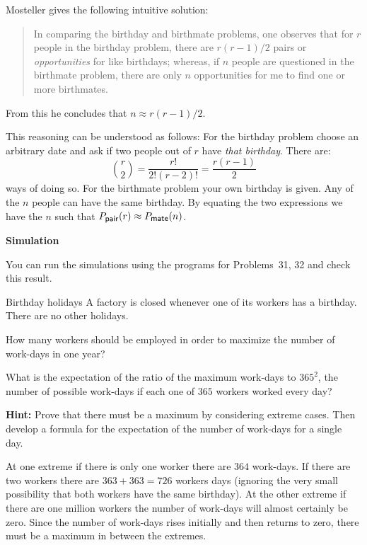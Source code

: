 
Mosteller \cite[p.~322]{birthday} gives the following intuitive solution:
\begin{quote}
In comparing the birthday and birthmate problems, one observes that for $r$ people in the birthday problem, there are $r(r-1)/2$ pairs or \emph{opportunities} for like birthdays; whereas, if $n$ people are questioned in the birthmate problem, there are only $n$ opportunities for me to find one or more birthmates.
\end{quote}
From this he concludes that $n\approx r(r-1)/2$.

This reasoning can be understood as follows: For the birthday problem choose an arbitrary date and ask if two people out of $r$ have \emph{that birthday}. There are:
\[
{r \choose 2}=\frac{r!}{2!(r-2)!} = \frac{r(r-1)}{2}
\]
ways of doing so. For the birthmate problem your own birthday is given. Any of the $n$ people can have the same birthday. By equating the two expressions we have the $n$ such that $P_{\textsf{\footnotesize pair}}(r) \approx P_{\textsf{\footnotesize mate}}(n)$.

\textbf{Simulation}

You can run the simulations using the programs for Problems~31, 32 and check this result.


\begin{prob}{Birthday holidays}
A factory is closed whenever one of its workers has a birthday. There are no other holidays.

 How many workers should be employed in order to maximize the number of work-days in one year?

 What is the expectation of the ratio of the maximum work-days to $365^2$, the number of possible work-days if each one of $365$ workers worked every day?

\textbf{Hint:} Prove that there must be a maximum by considering extreme cases. Then develop a formula for the expectation of the number of work-days for a single day.
\end{prob}

\solution{}

At one extreme if there is only one worker there are $364$ work-days. If there are two workers there are $363+363=726$ workers days (ignoring the very small possibility that both workers have the same birthday). At the other extreme if there are one million workers the number of work-days will almost certainly be zero. Since the number of work-days rises initially and then returns to zero, there must be a maximum in between the extremes.

